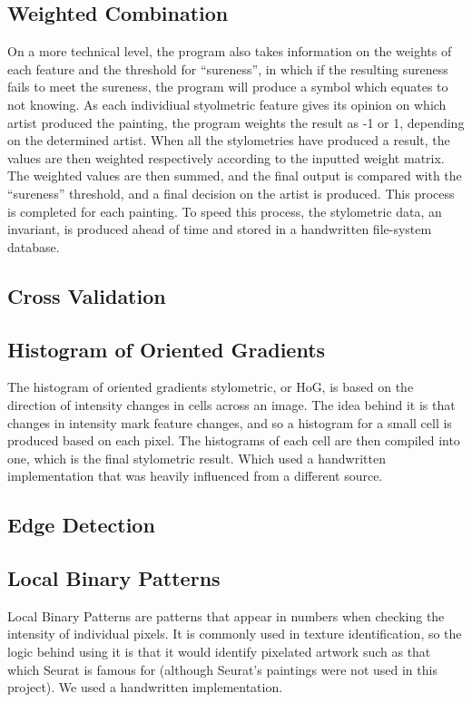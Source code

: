 \documentclass[twocolumn]{article}
\begin{document}
  \subsection{Weighted Combination}
  On a more technical level, the program also takes information on the weights
  of each feature and the threshold for ``sureness'', in which if the resulting
  sureness fails to meet the sureness, the program will produce a symbol which
  equates to not knowing. As each individiual styolmetric feature gives its
  opinion on which artist produced the painting, the program weights the result
  as -1 or 1, depending on the determined artist. When all the stylometries have
  produced a result, the values are then weighted respectively according to the
  inputted weight matrix. The weighted values are then summed, and the final
  output is compared with the ``sureness'' threshold, and a final decision on
  the artist is produced. This process is completed for each painting. To speed
  this process, the stylometric data, an invariant, is produced ahead of time
  and stored in a handwritten file-system database. \\

  \subsection{Cross Validation}

  \subsection{Histogram of Oriented Gradients}
  The histogram of oriented gradients stylometric, or HoG, is based on the
  direction of intensity changes in cells across an image. The idea behind it is
  that changes in intensity mark feature changes, and so a histogram for a small
  cell is produced based on each pixel. The histograms of each cell are then
  compiled into one, which is the final stylometric result. Which used a
  handwritten implementation that was heavily influenced from a different
  source.

  \subsection{Edge Detection}

  \subsection{Local Binary Patterns}
  Local Binary Patterns are patterns that appear in numbers when checking the
  intensity of individual pixels. It is commonly used in texture identification,
  so the logic behind using it is that it would identify pixelated artwork such
  as that which Seurat is famous for (although Seurat's paintings were not used
  in this project). We used a handwritten implementation.
\end{document}
